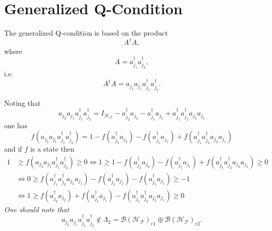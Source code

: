 \documentclass[aps,preprint]{revtex4}%
\begin{document}
\section{Generalized Q-Condition}

The generalized Q-condition is based on the product
\begin{equation}
A^{\dagger}A,
\end{equation}
where
\begin{equation}
A=a_{j_{1}}^{\dagger}a_{j_{2}}^{\dagger},
\end{equation}
i.e.%
\begin{equation}
A^{\dagger}A=a_{j_{2}}a_{j_{1}}a_{j_{1}}^{\dagger}a_{j_{2}}^{\dagger}.
\end{equation}


Noting that
\begin{equation}
a_{j_{2}}a_{j_{1}}a_{j_{1}}^{\dagger}a_{j_{2}}^{\dagger}=I_{\mathcal{H}%
_{\mathcal{F}}}-a_{j_{2}}^{\dagger}a_{j_{2}}-a_{j_{1}}^{\dagger}a_{j_{1}%
}+a_{j_{1}}^{\dagger}a_{j_{2}}^{\dagger}a_{j_{2}}a_{j_{1}}%
\end{equation}
one has
\begin{equation}
f\left(  a_{j_{2}}a_{j_{1}}a_{j_{1}}^{\dagger}a_{j_{2}}^{\dagger}\right)
=1-f\left(  a_{j_{2}}^{\dagger}a_{j_{2}}\right)  -f\left(  a_{j_{1}}^{\dagger
}a_{j_{1}}\right)  +f\left(  a_{j_{1}}^{\dagger}a_{j_{2}}^{\dagger}a_{j_{2}%
}a_{j_{1}}\right)
\end{equation}
and if $f$ is a state then
\begin{align}
1  &  \geq f\left(  a_{j_{2}}a_{j_{1}}a_{j_{1}}^{\dagger}a_{j_{2}}^{\dagger
}\right)  \geq0\Leftrightarrow1\geq1-f\left(  a_{j_{2}}^{\dagger}a_{j_{2}%
}\right)  -f\left(  a_{j_{1}}^{\dagger}a_{j_{1}}\right)  +f\left(  a_{j_{1}%
}^{\dagger}a_{j_{2}}^{\dagger}a_{j_{2}}a_{j_{1}}\right)  \geq0\nonumber\\
&  \Leftrightarrow0\geq f\left(  a_{j_{1}}^{\dagger}a_{j_{2}}^{\dagger
}a_{j_{2}}a_{j_{1}}\right)  -f\left(  a_{j_{2}}^{\dagger}a_{j_{2}}\right)
-f\left(  a_{j_{1}}^{\dagger}a_{j_{1}}\right)  \geq-1\nonumber\\
&  \Leftrightarrow1\geq f\left(  a_{j_{2}}^{\dagger}a_{j_{2}}\right)
+f\left(  a_{j_{1}}^{\dagger}a_{j_{1}}\right)  -f\left(  a_{j_{1}}^{\dagger
}a_{j_{2}}^{\dagger}a_{j_{2}}a_{j_{1}}\right)  \geq0
\end{align}
\emph{One should note that}
\begin{equation}
a_{j_{2}}a_{j_{1}}a_{j_{1}}^{\dagger}a_{j_{2}}^{\dagger}\notin\Lambda
_{2}=\mathcal{B}\left(  \mathcal{H}_{\mathcal{F}}\right)  _{e1}\oplus
\mathcal{B}\left(  \mathcal{H}_{\mathcal{F}}\right)  _{e2}.
\end{equation}
\end{document}
